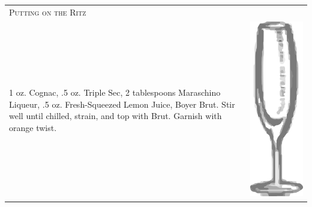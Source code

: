 \documentclass{article}
\begin{document}
\begin{tabular}{p{2in} p{0.5in}}
  \multicolumn{2}{p{3in}}{\centering\Huge\textsc{Putting on the Ritz}} \\ 
  
   \vspace{-0.1in}1 oz. Cognac, .5 oz. Triple Sec, 2 tablespoons Maraschino
    Liqueur, .5 oz. Fresh-Squeezed Lemon Juice, Boyer Brut. Stir well until
    chilled, strain, and top with Brut. Garnish with orange twist. &
   \vspace{-0.1in} \includegraphics{flute.png}
\end{tabular}
\end{document}
